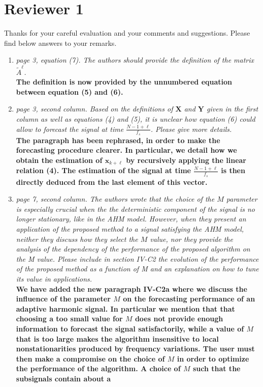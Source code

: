 \documentclass[11pt,DIV=16]{scrartcl}
\begin{document}
\section*{Reviewer 1}
Thanks for your careful evaluation and your comments and suggestions. Please find below answers to your remarks.
\begin{enumerate}[1)]
\item
\textit{page 3, equation (7). The authors should provide the definition of the matrix $\tilde{A}^\ell$.}\\
\textbf{The definition is now provided by the unnumbered equation between equation (5) and (6).}
\item
\textit{page 3, second column. Based on the definitions of $\mathbf{X}$ and $\mathbf{Y}$ given in the first column as well as equations (4) and (5), it is unclear how equation (6) could allow to forecast the signal at time $\frac{N-1+\ell}{f_s}$. Please give more details.}\\
\textbf{The paragraph has been rephrased, in order to make the forecasting procedure clearer. In particular, we detail how we obtain the estimation of $\mathbf{x}_{k+\ell}$ by recursively applying the linear relation (4). The estimation of the signal at time $\frac{N-1+\ell}{f_s}$ is then directly deduced from the last element of this vector.}
\item
\textit{page 7, second column. The authors wrote that the choice of the $M$ parameter is especially crucial when the the deterministic component of the signal is no longer stationary, like in the AHM model.
However, when they present an application of the proposed method to a signal satisfying the AHM model, neither they discuss how they select the $M$ value, nor they provide the analysis of the dependency of the performance of the proposed algorithm on the M value. Please include in section IV-C2 the evolution of the performance of the proposed method as a function of M and an explanation on how to tune its value in applications.}\\
\textbf{We have added the new paragraph IV-C2a where we discuss the influence of the parameter $M$ on the forecasting performance of an adaptive harmonic signal. In particular we mention that that choosing a too small value for $M$ does not provide enough information to forecast the signal satisfactorily, while a value of $M$ that is too large makes the algorithm insensitive to local nonstationarities produced by frequency variations. The user must then make a compromise on the choice of $M$ in order to optimize the performance of the algorithm. A choice of $M$ such that the subsignals contain about a
}
\end{enumerate}
\end{document}
